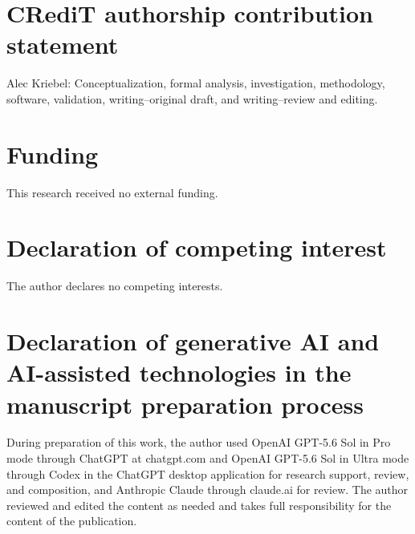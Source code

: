 \documentclass[11pt]{article}
\theoremstyle{remark}
\begin{document}
\section*{CRediT authorship contribution statement}

Alec Kriebel: Conceptualization, formal analysis, investigation, methodology,
software, validation, writing--original draft, and writing--review and editing.

\section*{Funding}

This research received no external funding.

\section*{Declaration of competing interest}

The author declares no competing interests.

\section*{Declaration of generative AI and AI-assisted technologies in the
manuscript preparation process}

During preparation of this work, the author used OpenAI GPT-5.6 Sol in Pro
mode through ChatGPT at chatgpt.com and OpenAI GPT-5.6 Sol in Ultra mode
through Codex in the ChatGPT desktop application for research support, review,
and composition, and Anthropic Claude through claude.ai for review.  The
author reviewed and edited the content as needed and takes full responsibility
for the content of the publication.
\end{document}
